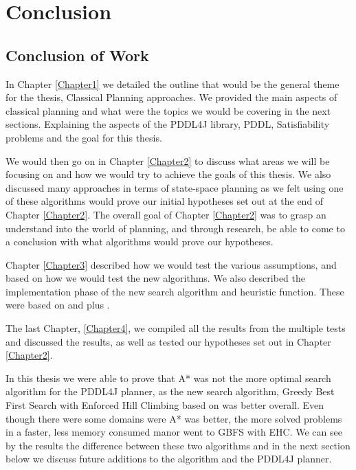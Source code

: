 \chapter{Conclusion} %

\label{Chapter5}

\section{Conclusion of Work}
In Chapter \ref{Chapter1} we detailed the outline that would be the general theme for the thesis, Classical Planning approaches. We provided the main aspects of classical planning and what were the topics we would be covering in the next sections. Explaining the aspects of the PDDL4J library, PDDL, Satisfiability problems and the goal for this thesis. 

We would then go on in Chapter \ref{Chapter2} to discuss what areas we will be focusing on and how we would try to achieve the goals of this thesis. We also discussed many approaches in terms of state-space planning as we felt using one of these algorithms would prove our initial hypotheses set out at the end of Chapter \ref{Chapter2}. The overall goal of Chapter \ref{Chapter2} was to grasp an understand into the world of planning, and through research, be able to come to a conclusion with what algorithms would prove our hypotheses. 

Chapter \ref{Chapter3} described how we would test the various assumptions, and based on \cite{Evaluation} how we would test the new algorithms. We also described the implementation phase of the new search algorithm and heuristic function. These were based on \cite{FFPlanner} and \cite{PlanningBook} plus \cite{HmHeuristic}. 

The last Chapter, \ref{Chapter4}, we compiled all the results from the multiple tests and discussed the results, as well as tested our hypotheses set out in Chapter \ref{Chapter2}.

In this thesis we were able to prove that A* was not the more optimal search algorithm for the PDDL4J planner, as the new search algorithm, Greedy Best First Search with Enforced Hill Climbing based on \cite{FFPlanner} was better overall. Even though there were some domains were A* was better, the more solved problems in a faster, less memory consumed manor went to GBFS with EHC. We can see by the results the difference between these two algorithms and in the next section below we discuss future additions to the algorithm and the PDDL4J planner. 

